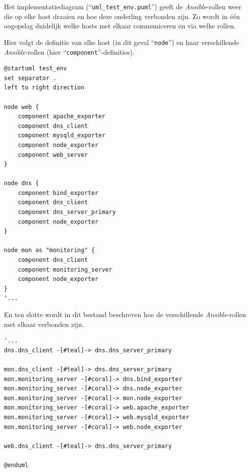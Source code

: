 Het implementatiediagram (``\texttt{uml\_test\_env.puml}'') geeft de \emph{Ansible}-rollen weer die op elke host draaien en hoe deze onderling verbonden zijn. Zo wordt in één oogopslag duidelijk welke hosts met elkaar communiceren en via welke rollen.

Hier volgt de definitie van elke host (in dit geval ``\texttt{node}'') en haar verschillende \emph{Ansible}-rollen (hier ``\texttt{component}''-definities).

\begin{codeblockfixed}
    \begin{codeblock}
        \begin{lstlisting}[language=plantuml]
@startuml test_env
set separator .
left to right direction

node web {
    component apache_exporter
    component dns_client
    component mysqld_exporter
    component node_exporter
    component web_server
}

node dns {
    component bind_exporter
    component dns_client
    component dns_server_primary
    component node_exporter
}

node mon as "monitoring" {
    component dns_client
    component monitoring_server
    component node_exporter
}
'...
\end{lstlisting}
        \caption[Implementatiediagram manuele testomgeving in tekstformaat (\emph{PlantUML}) (deel 1)]{``\texttt{node}''-definitie in het tekstformaat (``\texttt{uml\_test\_env.puml}'') van het implementatiediagram van de manuele testomgeving.}
        \label{code:uml_test_env_1.puml}
    \end{codeblock}
\end{codeblockfixed}

En ten slotte wordt in dit bestand beschreven hoe de verschillende \emph{Ansible}-rollen met elkaar verbonden zijn.

\begin{codeblockfixed}
    \begin{codeblock}
        \begin{lstlisting}[language=plantuml]
'...
dns.dns_client -[#teal]-> dns.dns_server_primary

mon.dns_client -[#teal]-> dns.dns_server_primary
mon.monitoring_server -[#coral]-> dns.bind_exporter
mon.monitoring_server -[#coral]-> dns.node_exporter
mon.monitoring_server -[#coral]-> mon.node_exporter
mon.monitoring_server -[#coral]-> web.apache_exporter
mon.monitoring_server -[#coral]-> web.mysqld_exporter
mon.monitoring_server -[#coral]-> web.node_exporter

web.dns_client -[#teal]-> dns.dns_server_primary

@enduml
\end{lstlisting}
        \caption[Implementatiediagram manuele testomgeving in tekstformaat (\emph{PlantUML}) (deel 2)]{``\texttt{component}''-verbindingen in het tekstformaat (``\texttt{uml\_test\_env.puml}'') van het implementatiediagram van de manuele testomgeving.}
        \label{code:uml_test_env_2.puml}
    \end{codeblock}
\end{codeblockfixed}

